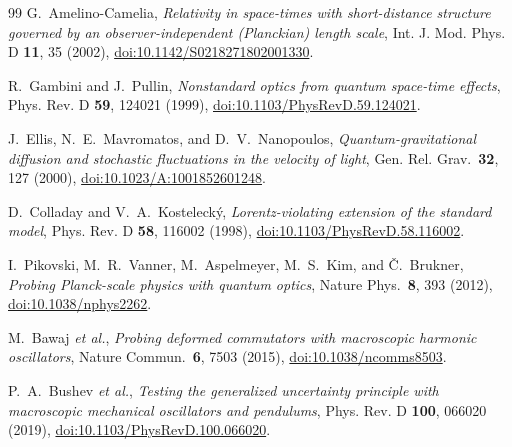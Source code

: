 \documentclass[aps,prd,twocolumn,showpacs,preprintnumbers]{revtex4-2}
\begin{document}
\begin{thebibliography}{99}
G.~Amelino-Camelia,
\textit{Relativity in space-times with short-distance structure governed by an
observer-independent (Planckian) length scale},
Int. J. Mod. Phys. D \textbf{11}, 35 (2002),
\href{https://doi.org/10.1142/S0218271802001330}{doi:10.1142/S0218271802001330}.

R.~Gambini and J.~Pullin,
\textit{Nonstandard optics from quantum space-time effects},
Phys. Rev. D \textbf{59}, 124021 (1999),
\href{https://doi.org/10.1103/PhysRevD.59.124021}{doi:10.1103/PhysRevD.59.124021}.

J.~Ellis, N.~E.~Mavromatos, and D.~V.~Nanopoulos,
\textit{Quantum-gravitational diffusion and stochastic fluctuations in the
velocity of light},
Gen. Rel. Grav.\ \textbf{32}, 127 (2000),
\href{https://doi.org/10.1023/A:1001852601248}{doi:10.1023/A:1001852601248}.

D.~Colladay and V.~A.~Kosteleck\'y,
\textit{Lorentz-violating extension of the standard model},
Phys. Rev. D \textbf{58}, 116002 (1998),
\href{https://doi.org/10.1103/PhysRevD.58.116002}{doi:10.1103/PhysRevD.58.116002}.

I.~Pikovski, M.~R.~Vanner, M.~Aspelmeyer, M.~S.~Kim, and \v{C}.~Brukner,
\textit{Probing Planck-scale physics with quantum optics},
Nature Phys.\ \textbf{8}, 393 (2012),
\href{https://doi.org/10.1038/nphys2262}{doi:10.1038/nphys2262}.

M.~Bawaj \textit{et al.},
\textit{Probing deformed commutators with macroscopic harmonic oscillators},
Nature Commun.\ \textbf{6}, 7503 (2015),
\href{https://doi.org/10.1038/ncomms8503}{doi:10.1038/ncomms8503}.

P.~A.~Bushev \textit{et al.},
\textit{Testing the generalized uncertainty principle with macroscopic
mechanical oscillators and pendulums},
Phys. Rev. D \textbf{100}, 066020 (2019),
\href{https://doi.org/10.1103/PhysRevD.100.066020}{doi:10.1103/PhysRevD.100.066020}.

\end{thebibliography}
\end{document}
